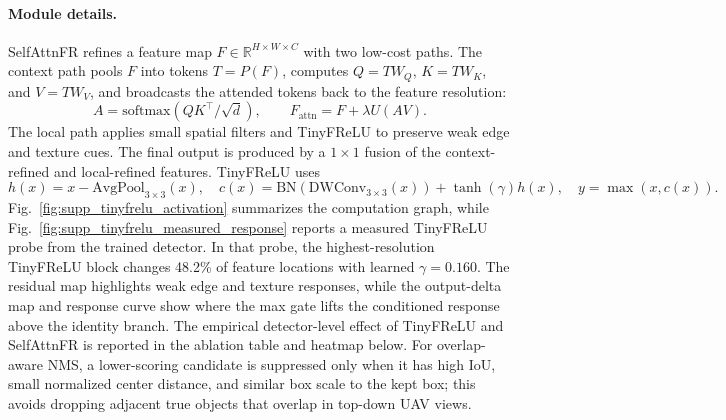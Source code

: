 \paragraph{Module details.}
SelfAttnFR refines a feature map $F\in\mathbb{R}^{H\times W\times C}$ with two
low-cost paths. The context path pools $F$ into tokens $T=P(F)$, computes
$Q=TW_Q$, $K=TW_K$, and $V=TW_V$, and broadcasts the attended tokens back to
the feature resolution:
\begin{equation}
    A=\mathrm{softmax}(QK^\top/\sqrt{d}),\qquad
    F_{\mathrm{attn}}=F+\lambda U(AV).
\end{equation}
The local path applies small spatial filters and TinyFReLU to preserve weak
edge and texture cues. The final output is produced by a $1\times1$ fusion of
the context-refined and local-refined features. TinyFReLU uses
\begin{equation}
    h(x)=x-\mathrm{AvgPool}_{3\times3}(x),\quad
    c(x)=\mathrm{BN}(\mathrm{DWConv}_{3\times3}(x))+\tanh(\gamma)h(x),\quad
    y=\max(x,c(x)).
\end{equation}
Fig.~\ref{fig:supp_tinyfrelu_activation} summarizes the computation graph, while
Fig.~\ref{fig:supp_tinyfrelu_measured_response} reports a measured TinyFReLU
probe from the trained detector. In that probe, the highest-resolution
TinyFReLU block changes 48.2\% of feature locations with learned
$\gamma=0.160$. The residual map highlights weak edge and texture responses,
while the output-delta map and response curve show where the max gate lifts the
conditioned response above the identity branch. The empirical detector-level
effect of TinyFReLU and SelfAttnFR is reported in the ablation table and heatmap
below.
For overlap-aware NMS, a lower-scoring candidate is suppressed only when it has
high IoU, small normalized center distance, and similar box scale to the kept
box; this avoids dropping adjacent true objects that overlap in top-down UAV
views.

